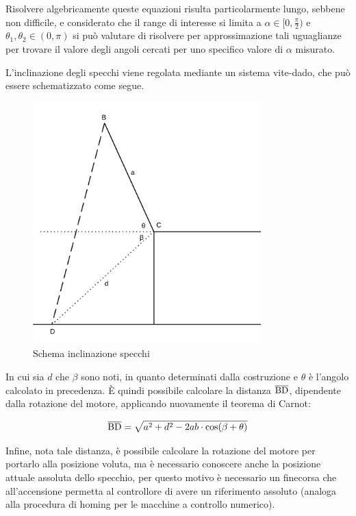 \documentclass[12pt]{article}
\begin{document}
    \noindent
    Risolvere algebricamente queste equazioni risulta particolarmente lungo, sebbene non difficile, e considerato che il range di interesse si limita a $\alpha \in [0, \frac{\pi}{2})$ e $\theta_1, \theta_2 \in (0, \pi)$ si può valutare di risolvere per approssimazione tali uguaglianze per trovare il valore degli angoli cercati per uno specifico valore di $\alpha$ misurato.
    
    \vspace{1cm}
    
    \noindent
    L'inclinazione degli specchi viene regolata mediante un sistema vite-dado, che può essere schematizzato come segue.
    
    \begin{figure}[h]
    \centering
        \includegraphics[width=250pt]{Draws/Linear_inclination_trig.png}
        \caption{Schema inclinazione specchi}
    \end{figure}
    
    \noindent
    In cui sia $d$ che $\beta$ sono noti, in quanto determinati dalla costruzione e $\theta$ è l'angolo calcolato in precedenza. È quindi possibile calcolare la distanza $\overline{\rm BD}$, dipendente dalla rotazione del motore, applicando nuovamente il teorema di Carnot:
    
    \begin{equation}
        \overline{\rm BD} = \sqrt{a^2 + d^2 - 2 a b \cdot \cos(\beta + \theta)}
    \end{equation}
    
    \vspace{1cm}
     
    \noindent
    Infine, nota tale distanza, è possibile calcolare la rotazione del motore per portarlo alla posizione voluta, ma è necessario conoscere anche la posizione attuale assoluta dello specchio, per questo motivo è necessario un finecorsa che all'accensione permetta al controllore di avere un riferimento assoluto (analoga alla procedura di homing per le macchine a controllo numerico).
\end{document}

